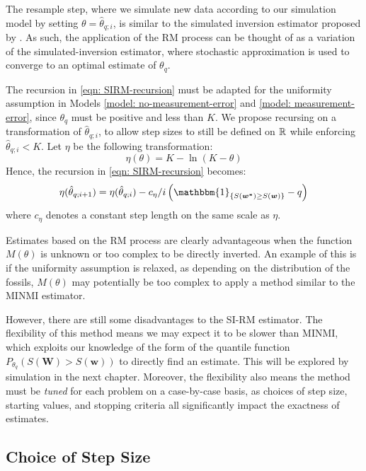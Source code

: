 The resample step, where we simulate new data according to our simulation model by setting $\theta = \hat\theta_{q; i}$, is similar to the simulated inversion estimator proposed by \citet{Huang2019}. As such, the application of the RM process can be thought of as a variation of the simulated-inversion estimator, where stochastic approximation is used to converge to an optimal estimate of $\theta_q$.

The recursion in \autoref{eqn: SIRM-recursion} must be adapted for the uniformity assumption in Models \ref{model: no-measurement-error} and \ref{model: measurement-error}, since $\theta_q$ must be positive and less than $K$. We propose recursing on a transformation of $\hat\theta_{q; i}$, to allow step sizes to still be defined on $\mathbb{R}$ while enforcing $\hat\theta_{q;i} < K$. Let $\eta$ be the following transformation:\begin{equation}
    \eta(\theta) = K -\ln(K-\theta)
\end{equation}
Hence, the recursion in \autoref{eqn: SIRM-recursion} becomes:
\begin{equation}
    \eta(\hat\theta_{q; i+1}) = \eta(\hat\theta_{q; i}) - c_\eta/i \left( \mathbbm{1}_{\{S(\bm{w^*}) \geq S(\bm{w})\}} - q \right)
\end{equation}
where $c_\eta$ denotes a constant step length on the same scale as $\eta$.

Estimates based on the RM process are clearly advantageous when the function $M(\theta)$ is unknown or too complex to be directly inverted. An example of this is if the uniformity assumption is relaxed, as depending on the distribution of the fossils, $M(\theta)$ may potentially be too complex to apply a method similar to the MINMI estimator. 

However, there are still some disadvantages to the SI-RM estimator. The flexibility of this method means we may expect it to be slower than MINMI, which exploits our knowledge of the form of the quantile function $P_{\theta_q}(S(\bm{W})>S(\bm{w}))$ to directly find an estimate. This will be explored by simulation in the next chapter. Moreover, the flexibility also means the method must be \textit{tuned} for each problem on a case-by-case basis, as choices of step size, starting values, and stopping criteria all significantly impact the exactness of estimates.

\subsection{Choice of Step Size}

